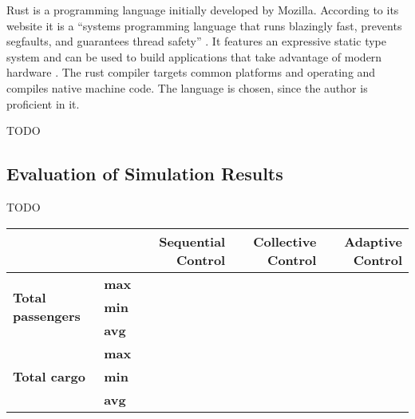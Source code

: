 Rust is a programming language initially developed by Mozilla.
According to its website it is a \enquote{systems programming language that runs blazingly fast, prevents segfaults, and guarantees thread safety} \autocite{rust2018rust}.
It features an expressive static type system and can be used to build applications that take advantage of modern hardware
\autocite[][]{matsakis2014rust}.
The rust compiler targets common platforms and operating and compiles native machine code.
The language is chosen, since the author is proficient in it.


TODO
\subsection{Evaluation of Simulation Results}
TODO

\begin{table}[]
\centering
\begin{tabular}{llrrr}
                                      &     & \begin{minipage}{2cm}\textbf{Sequential Control} \vspace{1em}\end{minipage} & \begin{minipage}{2cm}\textbf{Collective Control} \vspace{1em}\end{minipage} & \begin{minipage}{2cm}\textbf{Adaptive Control} \vspace{1em}\end{minipage}\\
\hline
\multirow{3}{*}{\textbf{Total passengers}}     & \textbf{max} &                   &                    &                  \\
                                               & \textbf{min} &                   &                    &                  \\
                                               & \textbf{avg} &                   &                    &                  \\
\hline                                               
\multirow{3}{*}{\textbf{Total cargo}}          & \textbf{max} &                   &                    &                  \\
                                               & \textbf{min} &                   &                    &                  \\
                                               & \textbf{avg} &                   &                    &                  \\

\end{tabular}
\end{table}
